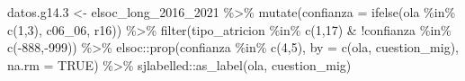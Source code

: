 \documentclass[
  12pt,
]{book}
\newenvironment{Shaded}{\begin{snugshade}}{\end{snugshade}}
\newcommand{\AttributeTok}[1]{\textcolor[rgb]{0.77,0.63,0.00}{#1}}
\newcommand{\ConstantTok}[1]{\textcolor[rgb]{0.00,0.00,0.00}{#1}}
\newcommand{\DecValTok}[1]{\textcolor[rgb]{0.00,0.00,0.81}{#1}}
\newcommand{\FloatTok}[1]{\textcolor[rgb]{0.00,0.00,0.81}{#1}}
\newcommand{\FunctionTok}[1]{\textcolor[rgb]{0.00,0.00,0.00}{#1}}
\newcommand{\NormalTok}[1]{#1}
\newcommand{\OtherTok}[1]{\textcolor[rgb]{0.56,0.35,0.01}{#1}}
\newcommand{\SpecialCharTok}[1]{\textcolor[rgb]{0.00,0.00,0.00}{#1}}
\begin{document}
\begin{Shaded}
\begin{Highlighting}[]
\NormalTok{datos.g14}\FloatTok{.3} \OtherTok{\textless{}{-}}\NormalTok{ elsoc\_long\_2016\_2021 }\SpecialCharTok{\%\textgreater{}\%} 
  \FunctionTok{mutate}\NormalTok{(}\AttributeTok{confianza =} \FunctionTok{ifelse}\NormalTok{(ola }\SpecialCharTok{\%in\%} \FunctionTok{c}\NormalTok{(}\DecValTok{1}\NormalTok{,}\DecValTok{3}\NormalTok{), c06\_06, r16)) }\SpecialCharTok{\%\textgreater{}\%} 
  \FunctionTok{filter}\NormalTok{(tipo\_atricion }\SpecialCharTok{\%in\%} \FunctionTok{c}\NormalTok{(}\DecValTok{1}\NormalTok{,}\DecValTok{17}\NormalTok{) }\SpecialCharTok{\&} \SpecialCharTok{!}\NormalTok{confianza }\SpecialCharTok{\%in\%} \FunctionTok{c}\NormalTok{(}\SpecialCharTok{{-}}\DecValTok{888}\NormalTok{,}\SpecialCharTok{{-}}\DecValTok{999}\NormalTok{)) }\SpecialCharTok{\%\textgreater{}\%} 
\NormalTok{  elsoc}\SpecialCharTok{::}\FunctionTok{prop}\NormalTok{(confianza }\SpecialCharTok{\%in\%} \FunctionTok{c}\NormalTok{(}\DecValTok{4}\NormalTok{,}\DecValTok{5}\NormalTok{), }\AttributeTok{by =} \FunctionTok{c}\NormalTok{(ola, cuestion\_mig), }\AttributeTok{na.rm =} \ConstantTok{TRUE}\NormalTok{) }\SpecialCharTok{\%\textgreater{}\%} 
\NormalTok{  sjlabelled}\SpecialCharTok{::}\FunctionTok{as\_label}\NormalTok{(ola, cuestion\_mig)}


\end{Highlighting}
\end{Shaded}
\end{document}

